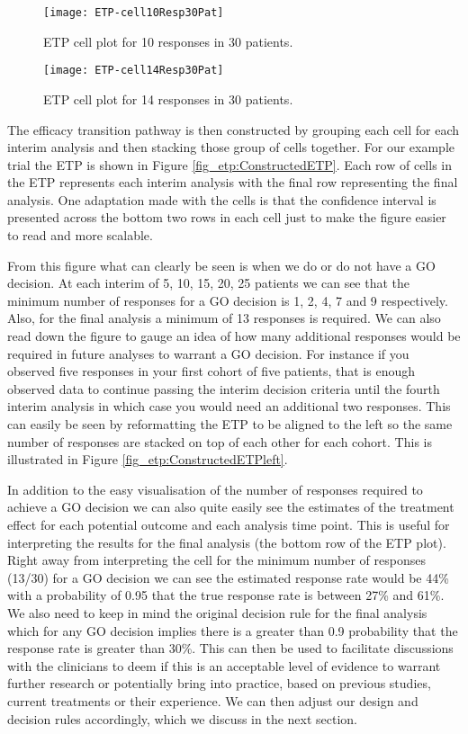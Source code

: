 \begin{figure}[h!]
	\centering
	\caption{ETP cell plot for 10 responses in 30 patients.}
	\label{fig_etp:Cell10Resp30Pat}
	\texttt{[image: ETP-cell10Resp30Pat]}
\end{figure}


\begin{figure}[h!]
	\centering
	\caption{ETP cell plot for 14 responses in 30 patients.}
	\label{fig_etp:Cell14Resp30Pat}
	\texttt{[image: ETP-cell14Resp30Pat]}
\end{figure}


The efficacy transition pathway is then constructed by grouping each cell for each interim analysis and then stacking those group of cells together. For our example trial the ETP is shown in Figure \ref{fig_etp:ConstructedETP}. Each row of cells in the ETP represents each interim analysis with the final row representing the final analysis. One adaptation made with the cells is that the confidence interval is presented across the bottom two rows in each cell just to make the figure easier to read and more scalable. 

From this figure what can clearly be seen is when we do or do not have a GO decision. At each interim of 5, 10, 15, 20, 25 patients we can see that the minimum number of responses for a GO decision is 1, 2, 4, 7 and 9 respectively. Also, for the final analysis a minimum of 13 responses is required. We can also read down the figure to gauge an idea of how many additional responses would be required in future analyses to warrant a GO decision. For instance if you observed five responses in your first cohort of five patients, that is enough observed data to continue passing the interim decision criteria until the fourth interim analysis in which case you would need an additional two responses. This can easily be seen by reformatting the ETP to be aligned to the left so the same number of responses are stacked on top of each other for each cohort. This is illustrated in Figure \ref{fig_etp:ConstructedETPleft}. 

In addition to the easy visualisation of the number of responses required to achieve a GO decision we can also quite easily see the estimates of the treatment effect for each potential outcome and each analysis time point. This is useful for interpreting the results for the final analysis (the bottom row of the ETP plot). Right away from interpreting the cell for the minimum number of responses (13/30) for a GO decision we can see the estimated response rate would be 44\% with a probability of 0.95 that the true response rate is between 27\% and 61\%. We also need to keep in mind the original decision rule for the final analysis which for any GO decision implies there is a greater than 0.9 probability that the response rate is greater than 30\%. This can then be used to facilitate discussions with the clinicians to deem if this is an acceptable level of evidence to warrant further research or potentially bring into practice, based on previous studies, current treatments or their experience. We can then adjust our design and decision rules accordingly, which we discuss in the next section. 

